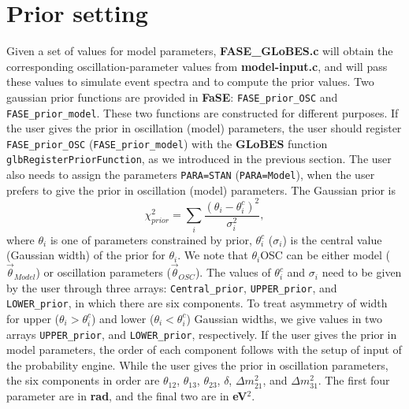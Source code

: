 \documentclass[aps,prd,nofootinbib,preprint]{revtex4}
\begin{document}
\section{Prior setting}\label{sec:prior}
Given a set of values for model parameters, \textbf{FASE\_GLoBES.c} will obtain the corresponding oscillation-parameter values from \textbf{model-input.c}, and will pass these values to simulate event spectra and to compute the prior values. Two gaussian prior functions are provided in \textbf{FaSE}: \texttt{FASE\_prior\_OSC} and \texttt{FASE\_prior\_model}. These two functions are constructed for different purposes. If the user gives the prior in oscillation (model) parameters, the user should register \texttt{FASE\_prior\_OSC} (\texttt{FASE\_prior\_model}) with the \textbf{GLoBES} function \texttt{glbRegisterPriorFunction}, as we introduced in the previous section. The user also needs to assign the parameters \texttt{PARA=STAN} (\texttt{PARA=Model}), when the user prefers to give the prior in oscillation (model) parameters. The Gaussian prior is 
\begin{equation}\label{eq:prior}
\chi^2_{prior}=\sum_{i} \frac{(\theta_i-\theta^c_i)^2}{\sigma_i^2},
\end{equation}
 where $\theta_i$ is one of parameters constrained by prior, $\theta^c_i$ ($\sigma_i$) is the central value (Gaussian width) of the prior for $\theta_i$. We note that $\theta_i${OSC} can be either model ($\vec{\theta}_{Model}$) or oscillation parameters ($\vec{\theta}_{OSC}$).
%
The values of $\theta^c_i$ and $\sigma_i$ need to be given by the user through three arrays: \texttt{Central\_prior}, \texttt{UPPER\_prior}, and \texttt{LOWER\_prior}, in which there are six components. To treat asymmetry of width for upper ($\theta_i>\theta_i^c$) and lower ($\theta_i<\theta_i^c$) Gaussian widths, we give values in two arrays \texttt{UPPER\_prior}, and \texttt{LOWER\_prior}, respectively. If the user gives the prior in model parameters, the order of each component follows with the setup of input of the probability engine. While the user gives the prior in oscillation parameters, the six components in order are $\theta_{12}$, $\theta_{13}$, $\theta_{23}$, $\delta$, $\Delta m_{21}^2$, and  $\Delta m_{31}^2$. The first four parameter are in \textbf{rad}, and the final two are in \textbf{eV$^2$}.
\end{document}

